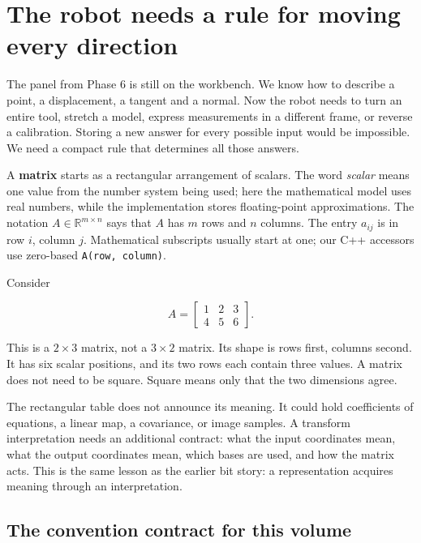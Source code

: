 \section{The robot needs a rule for moving every direction}\label{01-foundations-i-ch018-the-robot-needs-a-rule-for-moving-every-direction}

The panel from Phase 6 is still on the workbench. We know how to describe a point, a displacement, a tangent and a normal. Now the robot needs to turn an entire tool, stretch a model, express measurements in a different frame, or reverse a calibration. Storing a new answer for every possible input would be impossible. We need a compact rule that determines all those answers.

A \textbf{matrix} starts as a rectangular arrangement of scalars. The word \emph{scalar} means one value from the number system being used; here the mathematical model uses real numbers, while the implementation stores floating-point approximations. The notation \(A\in\mathbb R^{m\times n}\) says that \(A\) has \(m\) rows and \(n\) columns. The entry \(a_{ij}\) is in row \(i\), column \(j\). Mathematical subscripts usually start at one; our C++ accessors use zero-based \texttt{A(row,\ column)}.

Consider

\[
A=\begin{bmatrix}1&2&3\\4&5&6\end{bmatrix}.
\]

This is a \(2\times3\) matrix, not a \(3\times2\) matrix. Its shape is rows first, columns second. It has six scalar positions, and its two rows each contain three values. A matrix does not need to be square. Square means only that the two dimensions agree.

The rectangular table does not announce its meaning. It could hold coefficients of equations, a linear map, a covariance, or image samples. A transform interpretation needs an additional contract: what the input coordinates mean, what the output coordinates mean, which bases are used, and how the matrix acts. This is the same lesson as the earlier bit story: a representation acquires meaning through an interpretation.

\subsection{The convention contract for this volume}\label{01-foundations-i-ch018-the-convention-contract-for-this-volume}

